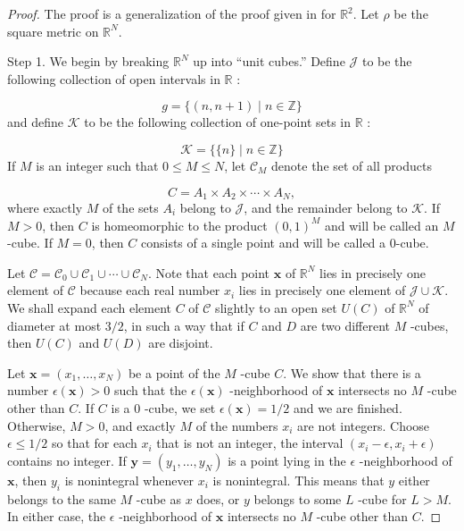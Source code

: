 \begin{proof}
The proof is a generalization of the proof given in  for \(\mathbb{R}^{2}\). Let \(\rho\) be the square metric on \(\mathbb{R}^{N}\).

Step 1. We begin by breaking \(\mathbb{R}^{N}\) up into ``unit cubes.'' Define \(\mathcal{J}\) to be the following collection of open intervals in \(\mathbb{R}\) :

\[
g = \{ ({n,n + 1}) \mid n \in \mathbb{Z}\}
\]
and define \(\mathcal{K}\) to be the following collection of one-point sets in \(\mathbb{R}\) :

\[
\mathcal{K} = \{ \{ n\} \mid n \in \mathbb{Z}\}
\]
If \(M\) is an integer such that \(0 \leq M \leq N\), let \(\mathcal{C}_{M}\) denote the set of all products

\[
C = A_{1} \times {A}_{2} \times \cdots \times {A}_{N},
\]
where exactly \(M\) of the sets \(A_{i}\) belong to \(\mathcal{J}\), and the remainder belong to \(\mathcal{K}\). If \(M > 0\), then \(C\) is homeomorphic to the product \({( 0,1) }^{M}\) and will be called an \(M\)-cube. If \(M = 0\), then \(C\) consists of a single point and will be called a 0-cube.

Let \(\mathcal{C} = \mathcal{C}_{0} \cup {\mathcal{C}}_{1} \cup \cdots \cup {\mathcal{C}}_{N}\). Note that each point \(\mathbf{x}\) of \(\mathbb{R}^{N}\) lies in precisely one element of \(\mathcal{C}\) because each real number \(x_{i}\) lies in precisely one element of \(\mathcal{J} \cup \mathcal{K}\). We shall expand each element \(C\) of \(\mathcal{C}\) slightly to an open set \(U( C)\) of \(\mathbb{R}^{N}\) of diameter at most \(3/2\), in such a way that if \(C\) and \(D\) are two different \(M\) -cubes, then \(U( C)\) and \(U( D)\) are disjoint.

Let \(\mathbf{x} = ({x_{1},\ldots ,x_{N}})\) be a point of the \(M\) -cube \(C\). We show that there is a number \(\epsilon ( \mathbf{x}) > 0\) such that the \(\epsilon ( \mathbf{x})\) -neighborhood of \(\mathbf{x}\) intersects no \(M\) -cube other than \(C\). If \(C\) is a 0 -cube, we set \(\epsilon ( \mathbf{x}) = 1/2\) and we are finished. Otherwise, \(M > 0\), and exactly \(M\) of the numbers \(x_{i}\) are not integers. Choose \(\epsilon \leq 1/2\) so that for each \(x_{i}\) that is not an integer, the interval \(({x_{i} - \epsilon ,x_{i} + \epsilon })\) contains no integer. If \(\mathbf{y} = ({y_{1},\ldots ,y_{N}})\) is a point lying in the \(\epsilon\) -neighborhood of \(\mathbf{x}\), then \(y_{i}\) is nonintegral whenever \(x_{i}\) is nonintegral. This means that \(y\) either belongs to the same \(M\) -cube as \(x\) does, or \(y\) belongs to some \(L\) -cube for \(L > M\). In either case, the \(\epsilon\) -neighborhood of \(\mathbf{x}\) intersects no \(M\) -cube other than \(C\).


\end{proof}
